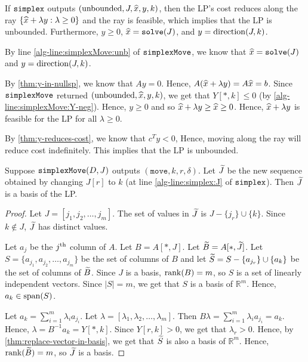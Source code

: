 \begin{theorem}
\label{thm:simplex-unbounded}
If $\operatorname{\mathtt{simplex}}$ outputs $(\textrm{unbounded}, J, \widehat{x}, y, k)$,
then the LP's cost reduces along the ray $\{\widehat{x} + \lambda y: \lambda \ge 0\}$
and the ray is feasible, which implies that the LP is unbounded.
Furthermore, $y \ge 0$, $\widehat{x} = \operatorname{\mathtt{solve}}(J)$, and $y = \operatorname{direction}(J, k)$.
\end{theorem}
\begin{longProof}
By line \cref{alg-line:simplexMove:unb} of $\operatorname{\mathtt{simplexMove}}$,
we know that $\widehat{x} = \operatorname{\mathtt{solve}}(J)$ and $y = \operatorname{direction}(J, k)$.

By \cref{thm:y-in-nullsp}, we know that $Ay = 0$.
Hence, $A(\widehat{x} + \lambda y) = A\widehat{x} = b$.
Since $\operatorname{\mathtt{simplexMove}}$ returned $(\textrm{unbounded}, \widehat{x}, y, k)$,
we get that $Y[*,k] \le 0$ (by \cref{alg-line:simplexMove:Y-neg}).
Hence, $y \ge 0$ and so $\widehat{x} + \lambda y \ge \widehat{x} \ge 0$.
Hence, $\widehat{x} + \lambda y$ is feasible for the LP for all $\lambda \ge 0$.

By \cref{thm:y-reduces-cost}, we know that $c^Ty < 0$,
Hence, moving along the ray will reduce cost indefinitely.
This implies that the LP is unbounded.
\end{longProof}

\begin{lemma}
\label{thm:simplex-new-basis}
Suppose $\operatorname{\mathtt{simplexMove}}(D, J)$ outputs $(\mathtt{move}, k, r, \delta)$.
Let $\widetilde{J}$ be the new sequence obtained by changing $J[r]$ to $k$
(at line \ref{alg-line:simplex:J} of $\operatorname{\mathtt{simplex}}$).
Then $\widetilde{J}$ is a basis of the LP.
\end{lemma}
\begin{proof}
Let $J = [j_1, j_2, \ldots, j_m]$.
The set of values in $\widetilde{J}$ is $J - \{j_r\} \cup \{k\}$.
Since $k \not\in J$, $\widetilde{J}$ has distinct values.

Let $a_j$ be the $j^{\textrm{th}}$ column of $A$. Let $B = A[*,J]$. Let $\widetilde{B} = A[*,\widetilde{J}]$.
Let $S = \{a_{j_1}, a_{j_2}, \ldots, a_{j_m}\}$ be the set of columns of $B$
and let $\widetilde{S} = S - \{a_{j_r}\} \cup \{a_k\}$ be the set of columns of $\widetilde{B}$.
Since $J$ is a basis, $\operatorname{rank}(B) = m$, so $S$ is a set of linearly independent vectors.
Since $|S| = m$, we get that $S$ is a basis of $\mathbb{R}^m$. Hence, $a_k \in \operatorname{span}(S)$.

Let $a_k = \sum_{i=1}^m \lambda_i a_{j_i}$. Let $\lambda = [\lambda_1, \lambda_2, \ldots, \lambda_m]$.
Then $B\lambda = \sum_{i=1}^m \lambda_i a_{j_i} = a_k$.
Hence, $\lambda = B^{-1}a_k = Y[*,k]$.
Since $Y[r,k] > 0$, we get that $\lambda_r > 0$.
Hence, by \cref{thm:replace-vector-in-basis}, we get that
$\widetilde{S}$ is also a basis of $\mathbb{R}^m$.
Hence, $\operatorname{rank}(\widetilde{B}) = m$, so $\widetilde{J}$ is a basis.
\end{proof}

